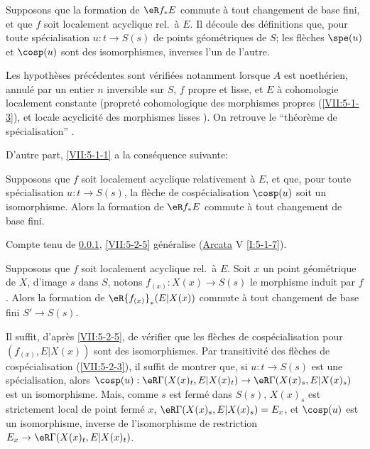 \subsubsection{}\label{VII:5-2-4}

Supposons que la formation de $\eR f_\ast E$ commute à tout changement de 
base fini, et que $f$ soit localement acyclique rel.\ à $E$. Il découle des 
définitions que, pour toute spécialisation $u:t\to S(s)$ de points 
géométriques de $S$; les flèches $\spe(u)$ et $\cosp(u)$ sont des 
isomorphismes, inverses l'un de l'autre. 

Les hypothèses précédentes sont vérifiées notamment lorsque $A$ est 
noethérien, annulé par un entier $n$ inversible sur $S$, $f$ propre et 
lisse, et $E$ à cohomologie localement constante (propreté cohomologique 
des morphismes propres (\ref{VII:5-1-3}), et locale acyclicité des morphismes 
lisses \cite[XV]{sga4}). On retrouve le ``théorème de spécialisation'' 
\cite[XVI 2.1]{sga4}. 

D'autre part, \ref{VII:5-1-1} a la conséquence suivante: 





\begin{proposition}\label{VII:5-2-5}
Supposons que $f$ soit localement acyclique relativement à $E$, et que, pour 
toute spécialisation $u:t\to S(s)$, la flèche de cospécialisation 
$\cosp(u)$ soit un isomorphisme. Alors la formation de $\eR f_\ast E$ commute 
à tout changement de base fini. 
\end{proposition}

Compte tenu de \ref{VII:5-2-4}, \ref{VII:5-2-5} généralise 
(\hyperref[I]{Arcata} V \ref{I:5-1-7}). 





\begin{corollary}\label{VII:5-2-6}
Supposons que $f$ soit localement acyclique rel.\ à $E$. Soit $x$ un point 
géométrique de $X$, d'image $s$ dans $S$, notons $f_{(x)}:X(x)\to S(s)$ le 
morphisme induit par $f$. Alors la formation de $\eR {f_{(x)}}_\ast(E|X(x))$ 
commute à tout changement de base fini $S'\to S(s)$. 
\end{corollary}

Il suffit, d'après \ref{VII:5-2-5}, de vérifier que les flèches de 
cospécialisation pour $(f_{(x)},E|X(x))$ sont des isomorphismes. Par 
transitivité des flèches de cospécialisation (\ref{VII:5-2-3}), il suffit 
de montrer que, si $u:t\to S(s)$ est une spécialisation, alors 
$\cosp(u):\eR\Gamma(X(x)_t,E|X(x)_t)\to \eR\Gamma(X(x)_s,E|X(x)_s)$ est un 
isomorphisme. Mais, comme $s$ est fermé dans $S(s)$, $X(x)_s$ est strictement 
local de point fermé $x$, $\eR\Gamma(X(x)_s,E|X(x)_s)=E_x$, et 
$\cosp(u)$ est un isomorphisme, inverse de l'isomorphisme de restriction 
$E_x\to \eR\Gamma(X(x)_t,E|X(x)_t)$. 





